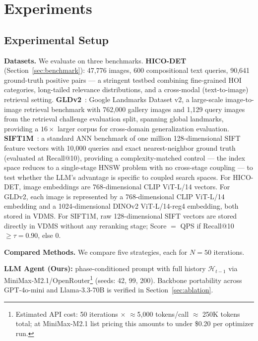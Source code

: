 \documentclass[sigconf, nonacm]{acmart}
\theoremstyle{definition}
\begin{document}
\section{Experiments}
\label{sec:experiments}

\subsection{Experimental Setup}

\noindent\textbf{Datasets.}
We evaluate on three benchmarks.
\textbf{HICO-DET} (Section~\ref{sec:benchmark}): 47{,}776 images, 600 compositional
text queries, 90{,}641 ground-truth positive pairs --- a stringent testbed combining
fine-grained HOI categories, long-tailed relevance distributions, and a cross-modal
(text-to-image) retrieval setting.
\textbf{GLDv2}~\cite{weyand2020gld}: Google Landmarks Dataset v2, a large-scale
image-to-image retrieval benchmark with 762{,}000 gallery images and 1{,}129 query
images from the retrieval challenge evaluation split, spanning global landmarks, providing
a $16\times$ larger corpus for cross-domain generalization evaluation.
\textbf{SIFT1M}~\cite{jegou2011pq}: a standard ANN benchmark of one million
128-dimensional SIFT feature vectors with 10{,}000 queries and exact nearest-neighbor
ground truth (evaluated at Recall@10), providing a complexity-matched control --- the index space
reduces to a single-stage HNSW problem with no cross-stage coupling --- to test
whether the LLM's advantage is specific to coupled search spaces.
For HICO-DET, image embeddings are 768-dimensional CLIP ViT-L/14 vectors.
For GLDv2, each image is represented by a 768-dimensional CLIP ViT-L/14 embedding
and a 1024-dimensional DINOv2 ViT-L/14-reg4 embedding, both stored in VDMS.
For SIFT1M, raw 128-dimensional SIFT vectors are stored directly in VDMS without
any reranking stage; Score $=$ QPS if Recall@10\,$\geq\tau{=}0.90$, else $0$.

\noindent\textbf{Compared Methods.}
We compare five strategies, each for $N{=}50$ iterations.

\noindent\textbf{LLM Agent (Ours):} phase-conditioned prompt with full history $\mathcal{H}_{t-1}$ via MiniMax-M2.1/OpenRouter\footnote{Estimated API cost: 50 iterations $\times$ $\approx$5,000 tokens/call $\approx$ 250K tokens total; at MiniMax-M2.1 list pricing this amounts to under \$0.20 per optimizer run.} (seeds: 42, 99, 200). Backbone portability across GPT-4o-mini and Llama-3.3-70B is verified in Section~\ref{sec:ablation}.
\end{document}
